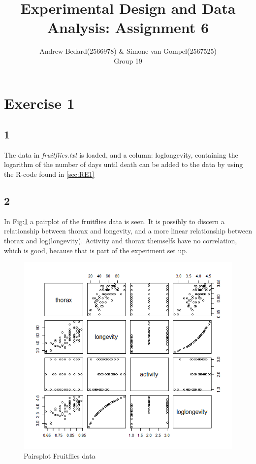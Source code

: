 \documentclass{article}
\title{Experimental Design and Data Analysis: Assignment 6}
\author{Andrew Bedard(2566978) \& Simone van Gompel(2567525) \\ Group 19}
\begin{document}
  \maketitle

  \section*{Exercise 1}
    \subsection*{1}
      The data in \textit{fruitflies.txt} is loaded, and a column: loglongevity, containing the logarithm of the number of days until death can be added to the data by using the R-code found in \ref{sec:RE1}
      
    \subsection*{2}
      In Fig:\ref{fig:PairFruit} a pairplot of the fruitflies data is seen. It is possibly to discern a relationship between thorax and longevity, and a more linear relationship between thorax and log(longevity).
      Activity and thorax themselfs have no correlation, which is good, because that is part of the experiment set up.
      \begin{figure}[H]
          \centering
          \includegraphics[scale=0.3]{../results/fruitflies2.png}
          \caption{Pairsplot Fruitflies data}
          \label{fig:PairFruit}
      \end{figure}
\end{document}
